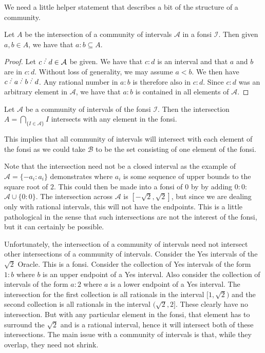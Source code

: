 \documentclass[12pt]{article}
\begin{document}
We need a little helper statement that describes a bit of the structure of a community.

\begin{lemma}
    Let $A$ be the intersection of a community of intervals $\mathcal{A}$ in a fonsi $\mathcal{I}$. Then given $a, b \in A$, we have that $a : b \subseteq A$.
\end{lemma}

\begin{proof}
    Let $c\lte d \in \mathcal{A}$ be given. We have that $c:d$ is an interval and that $a$ and $b$ are in $c:d$. Without loss of generality, we may assume $a < b$.  We then have $c \lte a \lte b \lte d$. Any rational number in $a:b$ is therefore also in $c:d$. Since $c:d$ was an arbitrary element in $\mathcal{A}$, we have that $a:b$ is contained in all elements of $\mathcal{A}$.
\end{proof}

\begin{proposition}\label{pr:fonsi-inf-inter}
Let $\mathcal{A}$ be a community of intervals of the fonsi $\mathcal{I}$. Then the intersection $A = \bigcap_{\{ I \in \mathcal{A}\}} I $ intersects with any element in the fonsi. 
\end{proposition}

This implies that all community of intervals will intersect with each element of the fonsi as we could take $\mathcal{B}$ to be the set consisting of one element of the fonsi. 

Note that the intersection need not be a closed interval as the example of $\mathcal{A} = \{ -a_i : a_i \}$ demonstrates where $a_i$ is some sequence of upper bounds to the square root of $2$. This could then be made into a fonsi of 0 by by adding $0:0$:  $\mathcal{A} \cup \{0:0\}$. The intersection across $\mathcal{A}$ is $[-\sqrt{2}, \sqrt{2}]$, but since we are dealing only with rational intervals, this will not have the endpoints. This is a little pathological in the sense that such intersections are not the interest of the fonsi, but it can certainly be possible. 

Unfortunately, the intersection of a community of intervals need not intersect other intersections of a community of intervals. Consider the Yes intervals of the $\sqrt{2}$ Oracle. This is a fonsi. Consider the collection of Yes intervals of the form $1:b$ where $b$ is an upper endpoint of a Yes interval. Also consider the collection of intervals of the form $a:2$ where $a$ is a lower endpoint of a Yes interval. The intersection for the first collection is all rationals in the interval $[1, \sqrt{2})$ and the second collection is all rationals in the interval $(\sqrt{2}, 2]$. These clearly have no intersection. But with any particular element in the fonsi, that element has to surround the $\sqrt{2}$ and is a rational interval, hence it will intersect both of these intersections. The main issue with a community of intervals is that, while they overlap, they need not shrink. 
\end{document}
